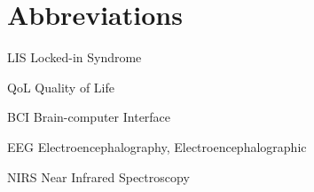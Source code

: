 \documentclass[11pt,a4paper]{report}
\numberwithin{equation}{section}
\newcommand{\acrolabel}[1]{\makebox[3cm][l]{\textbf{#1}}}
\newenvironment{acronyms}{\begin{list}{}{\renewcommand{\makelabel}{\acrolabel}}}{\end{list}}
\begin{document}
    \section*{Abbreviations}
    \begin{acronyms}
    \item[LIS] Locked-in Syndrome
    \item[QoL] Quality of Life
    \item[BCI] Brain-computer Interface
    \item[EEG] Electroencephalography, Electroencephalographic
    \item[NIRS] Near Infrared Spectroscopy
    \end{acronyms}

    \newpage

    
    

    
\end{document}

